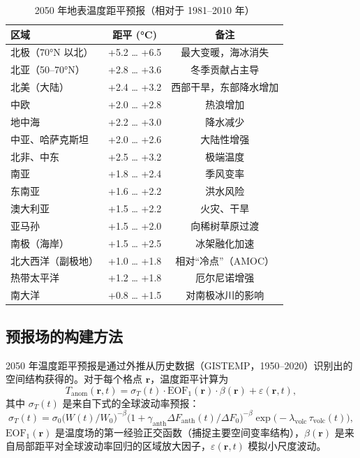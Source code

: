 \documentclass[12pt,a4paper]{article}
\begin{document}
	\begin{table}[htbp]
		\centering
		\caption{2050 年地表温度距平预报（相对于 1981–2010 年）}
		\label{tab:anomalies_2050}
		\small
		\begin{tabular}{p{4.5cm} c c}
			\toprule
			区域 & 距平 (°C) & 备注 \\
			\midrule
			北极（70°N 以北） & +5.2 … +6.5 & 最大变暖，海冰消失 \\
			北亚（50–70°N） & +2.8 … +3.6 & 冬季贡献占主导 \\
			北美（大陆） & +2.4 … +3.2 & 西部干旱，东部降水增加 \\
			中欧 & +2.0 … +2.8 & 热浪增加 \\
			地中海 & +2.2 … +3.0 & 降水减少 \\
			中亚、哈萨克斯坦 & +2.0 … +2.6 & 大陆性增强 \\
			北非、中东 & +2.5 … +3.2 & 极端温度 \\
			南亚 & +1.8 … +2.4 & 季风变率 \\
			东南亚 & +1.6 … +2.2 & 洪水风险 \\
			澳大利亚 & +1.5 … +2.2 & 火灾、干旱 \\
			亚马孙 & +1.5 … +2.0 & 向稀树草原过渡 \\
			南极（海岸） & +1.5 … +2.5 & 冰架融化加速 \\
			北大西洋（副极地） & +1.0 … +1.8 & 相对“冷点”（AMOC） \\
			热带太平洋 & +1.2 … +1.8 & 厄尔尼诺增强 \\
			南大洋 & +0.8 … +1.5 & 对南极冰川的影响 \\
			\bottomrule
		\end{tabular}
	\end{table}
	
	\subsection{预报场的构建方法}
	
	2050 年温度距平预报是通过外推从历史数据（GISTEMP，1950–2020）识别出的空间结构获得的。对于每个格点 \(\mathbf{r}\)，温度距平计算为
	\[
	T_{\mathrm{anom}}(\mathbf{r},t) = \sigma_T(t) \cdot \mathrm{EOF}_1(\mathbf{r}) \cdot \beta(\mathbf{r}) + \varepsilon(\mathbf{r},t),
	\]
	其中 \(\sigma_T(t)\) 是来自下式的全球波动率预报：
	\[
	\sigma_T(t) = \sigma_0 \bigl( W(t)/W_0 \bigr)^{-\beta} \bigl(1 + \gamma_{\mathrm{anth}} \Delta F_{\mathrm{anth}}(t)/\Delta F_0\bigr)^{-\beta} \exp\!\bigl(-\lambda_{\text{volc}} \,\tau_{\text{volc}}(t)\bigr),
	\]
	\(\mathrm{EOF}_1(\mathbf{r})\) 是温度场的第一经验正交函数（捕捉主要空间变率结构），\(\beta(\mathbf{r})\) 是来自局部距平对全球波动率回归的区域放大因子，\(\varepsilon(\mathbf{r},t)\) 模拟小尺度波动。
	
\end{document}
